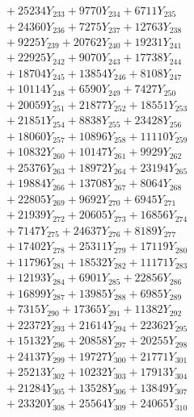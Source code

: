 \documentclass[a4paper,10pt]{article}
\begin{document}
{\begin{align}
&\;  + 25234 Y_{233} + 9770 Y_{234} + 6711 Y_{235} \\[0.3ex]
&\;  + 24360 Y_{236} + 7275 Y_{237} + 12763 Y_{238} \\[0.5ex]\allowbreak
&\;  + 9225 Y_{239} + 20762 Y_{240} + 19231 Y_{241} \\[0.3ex]
&\;  + 22925 Y_{242} + 9070 Y_{243} + 17738 Y_{244} \\[0.3ex]
&\;  + 18704 Y_{245} + 13854 Y_{246} + 8108 Y_{247} \\[0.3ex]
&\;  + 10114 Y_{248} + 6590 Y_{249} + 7427 Y_{250} \\[0.3ex]
&\;  + 20059 Y_{251} + 21877 Y_{252} + 18551 Y_{253} \\[0.3ex]
&\;  + 21851 Y_{254} + 8838 Y_{255} + 23428 Y_{256} \\[0.3ex]
&\;  + 18060 Y_{257} + 10896 Y_{258} + 11110 Y_{259} \\[0.3ex]
&\;  + 10832 Y_{260} + 10147 Y_{261} + 9929 Y_{262} \\[0.3ex]
&\;  + 25376 Y_{263} + 18972 Y_{264} + 23194 Y_{265} \\[0.3ex]
&\;  + 19884 Y_{266} + 13708 Y_{267} + 8064 Y_{268} \\[0.5ex]\allowbreak
&\;  + 22805 Y_{269} + 9692 Y_{270} + 6945 Y_{271} \\[0.3ex]
&\;  + 21939 Y_{272} + 20605 Y_{273} + 16856 Y_{274} \\[0.3ex]
&\;  + 7147 Y_{275} + 24637 Y_{276} + 8189 Y_{277} \\[0.3ex]
&\;  + 17402 Y_{278} + 25311 Y_{279} + 17119 Y_{280} \\[0.3ex]
&\;  + 11796 Y_{281} + 18532 Y_{282} + 11171 Y_{283} \\[0.3ex]
&\;  + 12193 Y_{284} + 6901 Y_{285} + 22856 Y_{286} \\[0.3ex]
&\;  + 16899 Y_{287} + 13985 Y_{288} + 6985 Y_{289} \\[0.3ex]
&\;  + 7315 Y_{290} + 17365 Y_{291} + 11382 Y_{292} \\[0.3ex]
&\;  + 22372 Y_{293} + 21614 Y_{294} + 22362 Y_{295} \\[0.3ex]
&\;  + 15132 Y_{296} + 20858 Y_{297} + 20255 Y_{298} \\[0.5ex]\allowbreak
&\;  + 24137 Y_{299} + 19727 Y_{300} + 21771 Y_{301} \\[0.3ex]
&\;  + 25213 Y_{302} + 10232 Y_{303} + 17913 Y_{304} \\[0.3ex]
&\;  + 21284 Y_{305} + 13528 Y_{306} + 13849 Y_{307} \\[0.3ex]
&\;  + 23320 Y_{308} + 25564 Y_{309} + 24065 Y_{310} \\[0.3ex]

\end{align}}
\end{document}
